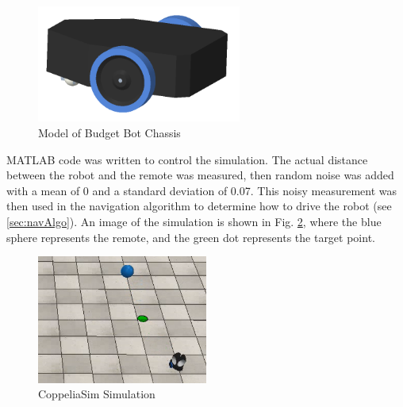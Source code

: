 \begin{figure}
    \centering
    \includegraphics[width=0.6\textwidth]{figs/img/budgetBotModel.png}
    \caption{Model of Budget Bot Chassis}
    \label{fig:budgetBotModel}
\end{figure}

\vspace*{12pt}
\noindent
MATLAB code was written to control the simulation. The actual distance between the robot and the remote was measured, then random noise was added with a mean of 0 and a standard deviation of 0.07. This noisy measurement was then used in the navigation algorithm to determine how to drive the robot (see \autoref{sec:navAlgo}). An image of the simulation is shown in Fig. \ref{fig:coppSimExample}, where the blue sphere represents the remote, and the green dot represents the target point.
\begin{figure}
    \centering
    \includegraphics[width=0.5\textwidth]{figs/img/coppSimExample.png}
    \caption{CoppeliaSim Simulation}
    \label{fig:coppSimExample}
\end{figure}


